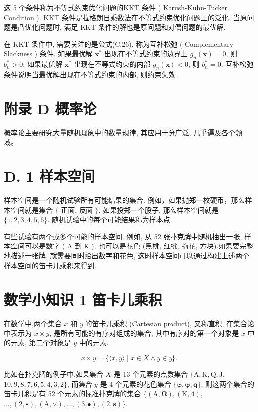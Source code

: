 \documentclass[10pt]{article}
\begin{document}
这 5 个条件称为不等式约束优化问题的KKT 条件 ( Karush-Kuhn-Tucker Condition ). KKT 条件是拉格朗日乘数法在不等式约束优化问题上的泛化. 当原问题是凸优化问题时, 满足 KKT 条件的解也是原问题和对偶问题的最优解.

在 KKT 条件中, 需要关注的是公式(C.26), 称为互补松弛 ( Complementary Slackness ) 条件. 如果最优解 $\boldsymbol{x}^{*}$ 出现在不等式约束的边界上 $g_{n}(\boldsymbol{x})=0$, 则\\
$b_{n}^{*}>0$; 如果最优解 $\boldsymbol{x}^{*}$ 出现在不等式约束的内部 $g_{n}(\boldsymbol{x})<0$, 则 $b_{n}^{*}=0$. 互补松弛条件说明当最优解出现在不等式约束的内部, 则约束失效.

\section*{附录 D 概率论}
概率论主要研究大量随机现象中的数量规律, 其应用十分广泛, 几乎遍及各个领域。

\section*{D. 1 样本空间}
样本空间是一个随机试验所有可能结果的集合. 例如，如果抛郑一枚硬币，那么样本空间就是集合 $\{$ 正面, 反面 $\}$. 如果投郑一个股子, 那么样本空间就是 $\{1,2,3,4,5,6\}$. 随机试验中的每个可能结果称为样本点.

有些试验有两个或多个可能的样本空间. 例如, 从 52 张扑克牌中随机抽出一张, 样本空间可以是数字 ( $\mathrm{A}$ 到 $\mathrm{K}$ ), 也可以是花色 (黑桃, 红桃, 梅花, 方块).如果要完整地描述一张牌, 就需要同时给出数字和花色, 这时样本空间可以通过构建上述两个样本空间的笛卡儿乘积来得到.

\section*{数学小知识 1 笛卡儿乘积}
在数学中,两个集合 $x$ 和 $y$ 的笛卡儿乘积 (Cartesian product), 又称直积, 在集合论中表示为 $x \times y$, 是所有可能的有序对组成的集合, 其中有序对的第一个对象是 $x$ 中的元素, 第二个对象是 $y$ 中的元素.

$$
x \times y=\{\langle x, y\rangle \mid x \in X \wedge y \in y\} .
$$

比如在扑克牌的例子中,如果集合 $X$ 是 13 个元素的点数集合 $\{\mathrm{A}, \mathrm{K}, \mathrm{Q}, \mathrm{J}$, $10,9,8,7,6,5,4,3,2\}$, 而集合 $y$ 是 4 个元素的花色集合 $\{\boldsymbol{\varphi}, \boldsymbol{\varphi}, \boldsymbol{q}\}$, 则这两个集合的笛卡儿积是有 52 个元素的标准扑克牌的集合 $\{(\mathrm{A}, \boldsymbol{\Omega}),(\mathrm{K}, \boldsymbol{4})$, $\ldots,(2, \boldsymbol{s}),(\mathrm{A}, \boldsymbol{\vee}), \ldots,(3, \boldsymbol{\bullet}),(2, \boldsymbol{s})\}$.
\end{document}
